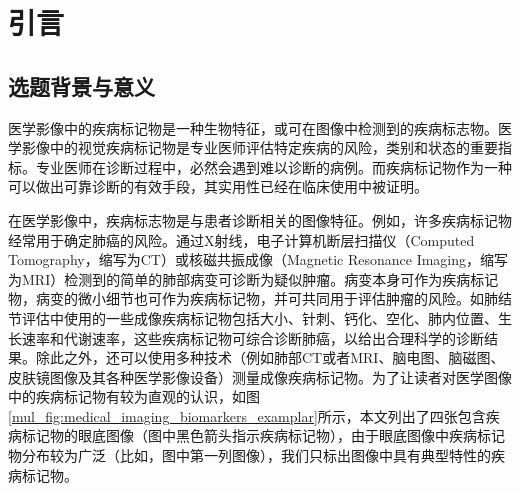 \chapter{引言}\label{cha:introduction}
\section{选题背景与意义}
\label{sec:background}
医学影像中的疾病标记物是一种生物特征，或可在图像中检测到的疾病标志物。医学影像中的视觉疾病标记物是专业医师评估特定疾病的风险，类别和状态的重要指标。专业医师在诊断过程中，必然会遇到难以诊断的病例。而疾病标记物作为一种可以做出可靠诊断的有效手段，其实用性已经在临床使用中被证明。

在医学影像中，疾病标志物是与患者诊断相关的图像特征。例如，许多疾病标记物经常用于确定肺癌的风险。通过X射线，电子计算机断层扫描仪（Computed Tomography，缩写为CT）或核磁共振成像（Magnetic Resonance Imaging，缩写为MRI）检测到的简单的肺部病变可诊断为疑似肿瘤。病变本身可作为疾病标记物，病变的微小细节也可作为疾病标记物，并可共同用于评估肿瘤的风险。如肺结节评估中使用的一些成像疾病标记物包括大小、针刺、钙化、空化、肺内位置、生长速率和代谢速率，这些疾病标记物可综合诊断肺癌，以给出合理科学的诊断结果。除此之外，还可以使用多种技术（例如肺部CT或者MRI、脑电图、脑磁图、皮肤镜图像及其各种医学影像设备）测量成像疾病标记物。为了让读者对医学图像中的疾病标记物有较为直观的认识，如图\ref{mul_fig:medical_imaging_biomarkers_examplar}所示，本文列出了四张包含疾病标记物的眼底图像（图中黑色箭头指示疾病标记物），由于眼底图像中疾病标记物分布较为广泛（比如，图中第一列图像），我们只标出图像中具有典型特性的疾病标记物。




